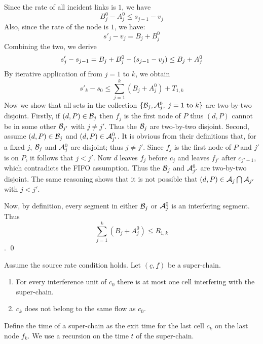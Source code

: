Since the rate of all incident links is $1$, we have
$$
B^0_j-A^0_j \leq s_{j-1}- v_j
$$
Also, since the rate of the node is $1$, we have:
$$
s'_j - v_j = B_j + B^0_j
$$
Combining the two, we derive
\begin{equation}\mylabel{eq-lemsc73}
 s'_j - s_{j-1} = B_j + B^0_j -(s_{j-1} - v_j) \leq B_j + A^0_j
\end{equation}
By iterative application of  from $j=1$ to $k$,
we obtain
$$
s'_k -s_0 \leq \sum_{j=1}^k (B_j + A^0_j) + T_{1, k}
$$
Now we show that all sets in the collection $\{\mathcal B_j, \mathcal A^0_j,
\; j=1 \mbox{ to } k\}$ are two-by-two disjoint. Firstly, if
$(d,P) \in \mathcal B_j$ then $f_j$ is the first node of $P$ thus
$(d,P)$ cannot be in some other $ \mathcal B_{j'}$ with $j \neq j'$.
Thus the $\mathcal B_j$ are two-by-two disjoint. Second, assume
$(d,P)\in \mathcal B_j$ and $(d,P)\in \mathcal A^0_{j'}$. It is obvious from
their definitions that, for a fixed $j$, $\mathcal B_j$ and $\mathcal A^0_j$
are disjoint; thus $j \neq j'$. Since $f_j$ is the first node of
$P$ and $j'$ is on $P$, it follows that $j < j'$. Now $d$ leaves
$f_j$ before $c_j$ and leaves $f_{j'}$ after $c_{j'-1}$, which
contradicts the FIFO assumption. Thus the $\mathcal B_j$ and
$\mathcal A^0_{j'}$ are two-by-two disjoint. The same reasoning shows
that it is not possible that $(d,P) \in \mathcal A_j \bigcap
\mathcal A_{j'}$ with $j < j'$.

Now, by definition, every segment in either $\mathcal B_j$ or
$\mathcal A^0_j$ is an interfering segment. Thus
$$\sum_{j=1}^k (B_j + A^0_j) \leq R_{1,k}$$.
 \qed

\begin{proposition}
 Assume the source rate condition holds.
Let $(\underline{c}, \underline{f})$ be a super-chain.
\begin{enumerate}
  \item  For every interference unit of $c_0$
  there is at most one cell interfering with the super-chain.
  \item $c_k$ does not belong to the same flow as $c_0$.
\end{enumerate}
\end{proposition}
\pr
Define the time of a super-chain as the exit time for the last
cell $c_k$ on the last node $f_k$.  We use a recursion on the time
$t$ of the super-chain.

